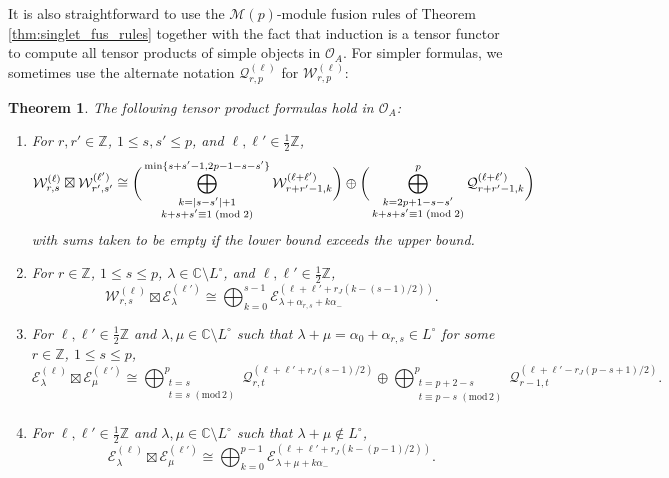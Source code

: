 \documentclass[11pt, reqno]{amsart}
\newtheorem{thm}{Theorem}[section]
\theoremstyle{definition}\newtheorem{defi}[thm]{Definition}
\theoremstyle{definition}\newtheorem{rem}[thm]{Remark}
\theoremstyle{definition}\newtheorem{exam}[thm]{Example}
\theoremstyle{definition}\newtheorem{assum}[thm]{Assumption}
\newcommand{\cE}{\mathcal{E}}
\newcommand{\cM}{\mathcal{M}}
\newcommand{\cO}{\mathcal{O}}
\newcommand{\cW}{\mathcal{W}}
\newcommand{\cQ}{\mathcal{Q}}
\newcommand{\CC}{\mathbb{C}}
\newcommand{\ZZ}{\mathbb{Z}}
\newcommand{\tens}{\boxtimes}
\begin{document}
It is also straightforward to use the $\cM(p)$-module fusion rules of Theorem \ref{thm:singlet_fus_rules} together with the fact that induction is a tensor functor to compute all tensor products of simple objects in $\cO_A$. For simpler formulas, we sometimes use the alternate notation $\cQ_{r,p}^{(\ell)}$ for $\cW_{r,p}^{(\ell)}$:
\begin{thm}\label{thm:general_fusion_rules}
The following tensor product formulas hold in $\cO_A$:
\begin{enumerate}
\item For $r,r'\in\ZZ$, $1\leq s,s'\leq p$, and $\ell,\ell'\in\frac{1}{2}\ZZ$,
 \begin{equation*}
   \cW_{r,s}^{(\ell)}\boxtimes \cW_{r',s'}^{(\ell')}   \cong \bigg(\bigoplus_{\substack{k = |s-s'|+1 \\ k+s+s' \equiv 1\; (\mathrm{mod}\; 2)}}^{{\rm min}\{s+s'-1, 2p-1-s-s'\}}\cW_{r+r'-1, k}^{(\ell+\ell')}\bigg) \oplus \bigg(\bigoplus_{\substack{k = 2p+1-s-s'\\ k+s+s' \equiv 1\; (\mathrm{mod}\; 2)}}^{p}\cQ_{r+r'-1, k}^{(\ell+\ell')}\bigg)
  \end{equation*}
with sums taken to be empty if the lower bound exceeds the upper bound. 
 
  \item 
  For $r\in\ZZ$, $1\leq s\leq p$, $\lambda\in\CC\setminus L^\circ$, and $\ell,\ell'\in\frac{1}{2}\ZZ$,
 \begin{equation*}
  \cW_{r,s}^{(\ell)}\tens\cE_\lambda^{(\ell')}\cong\bigoplus_{k=0}^{s-1} \cE_{\lambda+\alpha_{r,s}+k\alpha_-}^{(\ell+\ell'+r_J(k-(s-1)/2))}.
 \end{equation*}
  
  
  \item
  For $\ell,\ell'\in\frac{1}{2}\ZZ$ and $\lambda,\mu\in\CC\setminus L^\circ$ such that $\lambda+\mu =\alpha_0+\alpha_{r,s}\in L^\circ$ for some $r\in\ZZ$, $1\leq s\leq p$,
  \begin{equation*}
  \cE_\lambda^{(\ell)}\tens\cE_{\mu}^{(\ell')}\cong\bigoplus_{\substack{t= s\\ t\equiv s\,\,(\mathrm{mod}\,2)\\}}^p \cQ_{r,t}^{(\ell+\ell'+r_J(s-1)/2)}\oplus\bigoplus_{\substack{t=p+2-s\\t\equiv p-s\,\,(\mathrm{mod}\,2)\\}}^p \cQ_{r-1,t}^{(\ell+\ell'-r_J(p-s+1)/2)}.
 \end{equation*}
  
  
  \item
  For $\ell,\ell'\in\frac{1}{2}\ZZ$ and $\lambda,\mu\in\CC\setminus L^\circ$ such that $\lambda+\mu\notin L^\circ$,
\begin{equation*}
\cE_{\lambda}^{(\ell)}\tens\cE_\mu^{(\ell')} \cong \bigoplus_{k=0}^{p-1} \cE_{\lambda + \mu + k \alpha_-}^{(\ell+\ell'+r_J(k-(p-1)/2))}.
\end{equation*}
\end{enumerate}
\end{thm}
\end{document}
